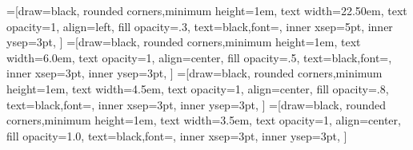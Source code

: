 
=[draw=black,
    rounded corners,minimum height=1em,
    text width=22.50em,
    text opacity=1,
    align=left,
    fill opacity=.3, text=black,font=\scriptsize,
    inner xsep=5pt, inner ysep=3pt,
    ]
=[draw=black,
    rounded corners,minimum height=1em,
    text width=6.0em,
    text opacity=1, align=center,
    fill opacity=.5, text=black,font=\scriptsize,
    inner xsep=3pt, inner ysep=3pt,
    ]
=[draw=black,
    rounded corners,minimum height=1em,
    text width=4.5em,
    text opacity=1, align=center,
    fill opacity=.8, text=black,font=\scriptsize,
    inner xsep=3pt, inner ysep=3pt,
    ]
=[draw=black,
    rounded corners,minimum height=1em,
    text width=3.5em,
    text opacity=1, align=center,
    fill opacity=1.0, text=black,font=\scriptsize,
    inner xsep=3pt, inner ysep=3pt,
]

